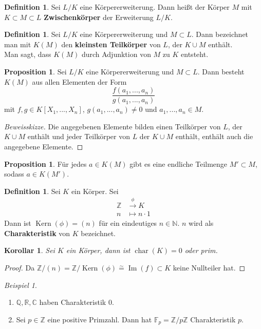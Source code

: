 \documentclass[10pt,a4paper]{article}
\newcommand{\N}{\ensuremath{\mathbb{N}}}
\newcommand{\Z}{\ensuremath{\mathbb{Z}}}
\newcommand{\Q}{\ensuremath{\mathbb{Q}}}
\newcommand{\R}{\ensuremath{\mathbb{R}}}
\newcommand{\C}{\ensuremath{\mathbb{C}}}
\newcommand{\F}{\ensuremath{\mathbb{F}}}
\newcommand{\cha}{\operatorname{char}}
\newcommand{\isom}{\overset{\sim}{=}}
\newcommand{\Kern}{\operatorname{Kern}}
\newcommand{\Img}{\operatorname{Im}}
\theoremstyle{plain}
\newtheorem{kor}[theorem]{Korollar}
\theoremstyle{definition}
\newtheorem{definition}[theorem]{Definition}
\newtheorem{prop}[theorem]{Proposition}
\theoremstyle{remark}
\newtheorem{exm}[theorem]{Beispiel}
\begin{document}
	\begin{definition}
		Sei $L/K$ eine Körpererweiterung. Dann heißt der Körper $M$ mit $K\subset M\subset L$ \textbf{Zwischenkörper} der Erweiterung $L/K$.
	\end{definition}

	\begin{definition}
		Sei $L/K$ eine Körpererweiterung und $M\subset L$. Dann bezeichnet man mit $K(M)$ den \textbf{kleinsten Teilkörper} von $L$, der $K\cup M$ enthält.\\
		Man sagt, dass $K(M)$ durch Adjunktion von $M$ zu $K$ entsteht.
	\end{definition}

	\begin{prop}
		Sei $L/K$ eine Körpererweiterung und $M\subset L$. Dann besteht $K(M)$ aus allen Elementen der Form
		\[\frac{f(a_1,...,a_n)}{g(a_1,...,a_n)}\]
		mit $f,g\in K[X_1,...,X_n]$, $g(a_1,...,a_n)\neq 0$ und $a_1,...,a_n\in M$.
	\end{prop}
	\begin{proof}[Beweisskizze]
		Die angegebenen Elemente bilden einen Teilkörper von $L$, der $K\cup M$ enthält und jeder Teilkörper von $L$ der $K\cup M$ enthält, enthält auch die angegebene Elemente.
	\end{proof}

	\begin{prop}
		Für jedes $a\in K(M)$ gibt es eine endliche Teilmenge $M'\subset M$, sodass $a\in K(M')$.
	\end{prop}

	\begin{definition}
		Sei $K$ ein Körper. Sei\begin{align*}
		\Z&\xrightarrow{\phi}K\\
		n&\mapsto n\cdot 1
		\end{align*}
		Dann ist $\Kern(\phi)=(n)$ für ein eindeutiges $n\in \N$. $n$ wird als \textbf{Charakteristik} von $K$ bezeichnet.
	\end{definition}

	\begin{kor}
		Sei $K$ ein Körper, dann ist $\cha(K)=0$ oder prim.
	\end{kor}
	\begin{proof}
		Da $\Z/(n)=\Z/\Kern(\phi)\isom\Img(f)\subset K$ keine Nullteiler hat.
	\end{proof}

	\begin{exm}
		\begin{enumerate}
			\item $\Q,\R,\C$ haben Charakteristik 0.
			\item Sei $p\in\Z$ eine positive Primzahl. Dann hat $\F_p=\Z/p\Z$ Charakteristik $p$.
		\end{enumerate}
	\end{exm}
\end{document}
